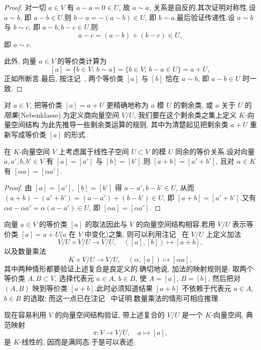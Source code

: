 \begin{proof}
对一切 $a \in V$ 有 $a - a = 0 \in U$, 故 $a \sim a$, 关系是自反的.其次证明对称性.设 $a \sim b$, 即 $a - b \in U$.则 $b - a = -(a - b) \in U$, 即 $b \sim a$.最后验证传递性.设 $a \sim b$ 与 $b \sim c$, 即 $a - b, b - c \in U$.则
\[
a - c = (a - b) + (b - c) \in U,
\]
即 $a \sim c$.

此外, 向量 $a \in V$ 的等价类计算为
\[
[a] = \{b \in V;\, b \sim a\} = \{b \in V;\, b - a \in U\} = a + U,
\]
正如所断言.最后, 按注记~, 两个等价类 $[a]$ 与 $[b]$ 恰在 $a \sim b$, 即 $a - b \in U$ 时一致.
\end{proof}

对 $a \in V$, 把等价类 $[a] = a + U$ 更精确地称为 $a$ 模 $U$ 的剩余类, 或 $a$ 关于 $U$ 的\emph{陪集}(\textup{Nebenklasse}).为定义商向量空间 $V/U$, 我们要在这个剩余类之集上定义 $K$-向量空间结构.为此先推导一些剩余类运算的规则, 其中为清楚起见把剩余类 $a + U$ 重新写成等价类 $[a]$ 的形式.

\begin{remark}\label{rem:2.2.6}
在 $K$-向量空间 $V$ 上考虑属于线性子空间 $U \subset V$ 的模 $U$ 同余的等价关系.设对向量 $a, a', b, b' \in V$ 有 $[a] = [a']$ 与 $[b] = [b']$.则 $[a + b] = [a' + b']$, 且对 $\alpha \in K$ 有 $[\alpha a] = [\alpha a']$.
\end{remark}

\begin{proof}
由 $[a] = [a']$, $[b] = [b']$ 得 $a - a', b - b' \in U$, 从而 $(a + b) - (a' + b') = (a - a') + (b - b') \in U$, 即 $[a + b] = [a' + b']$.又有 $\alpha a - \alpha a' = \alpha(a - a') \in U$, 即 $[\alpha a] = [\alpha a']$.
\end{proof}

向量 $a \in V$ 的等价类 $[a]$ 的取法因此与 $V$ 的向量空间结构相容.若用 $V/U$ 表示等价类 $[a] = a + U$($a$ 在 $V$ 中变化)之集, 则可以利用注记~ 在 $V/U$ 上定义加法
\[
V/U \times V/U \longrightarrow V/U, \quad ([a], [b]) \longmapsto [a + b],
\]
以及数量乘法
\[
K \times V/U \longrightarrow V/U, \quad (\alpha, [a]) \longmapsto [\alpha a],
\]
其中两种情形都要验证上述复合是良定义的.确切地说, 加法的映射规则是: 取两个等价类 $A, B \subset V$, 选择代表元 $a \in A$, $b \in B$, 使 $A = [a]$, $B = [b]$, 然后把对 $(A, B)$ 映到等价类 $[a + b]$.此时必须知道结果 $[a + b]$ 不依赖于代表元 $a \in A$, $b \in B$ 的选取; 而这一点已在注记~ 中证明.数量乘法的情形可相应推理.

现在容易利用 $V$ 的向量空间结构验证, 带上述复合的 $V/U$ 是一个 $K$-向量空间, 典范映射
\[
\pi \colon V \longrightarrow V/U, \quad a \longmapsto [a],
\]
是 $K$-线性的, 因而是满同态.于是可以表述:

